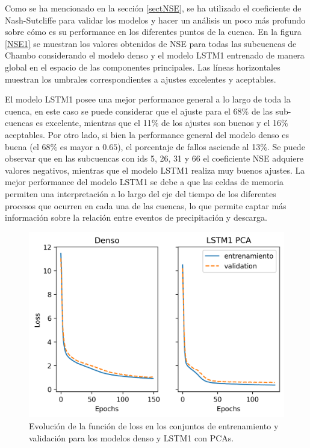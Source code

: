 Como se ha mencionado en la sección \ref{sectNSE}, se ha utilizado el coeficiente de Nash-Sutcliffe para
validar los modelos y hacer un análisis un poco más profundo sobre cómo es su performance en los diferentes puntos
de la cuenca. En la figura \ref{NSE1} se muestran los valores obtenidos 
de NSE para todas las subcuencas de Chambo considerando el modelo denso y el modelo LSTM1 entrenado de manera global 
en el espacio de las componentes principales. Las líneas horizontales muestran los umbrales correspondientes a 
ajustes excelentes y aceptables. 

El modelo LSTM1 posee una mejor performance general a lo largo de toda la cuenca, 
en este caso se  puede considerar que el ajuste para el 68$\%$ de las sub-cuencas es excelente, 
mientras que el 11$\%$ de los ajustes son buenos y el 16$\%$  aceptables. 
Por otro lado, si bien la performance general del modelo denso es buena (el 68$\%$ es mayor a $0.65$), 
el porcentaje de fallos asciende al 13$\%$. Se puede observar que en las subcuencas con ids 5, 26, 31 y 66 el coeficiente NSE adquiere 
valores negativos, mientras que el modelo LSTM1 realiza muy buenos ajustes.
La mejor performance del modelo LSTM1 se debe a que las celdas de memoria permiten una interpretación a lo largo del eje del tiempo de 
los diferentes procesos que ocurren en cada una de las cuencas, lo que permite captar más información sobre la relación entre
eventos de precipitación y descarga. 


\begin{figure}[h!]
  \begin{center}
    \includegraphics[height=3.in]{Figures/loss/comp_loss.png}
    \caption{ Evolución de la función de loss en los conjuntos de entrenamiento y validación para los modelos denso y
    LSTM1 con PCAs.}
    \label{losscomp}
  \end{center}
\end{figure}

